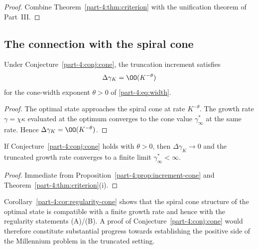 \begin{proof}
Combine Theorem~\ref{part-4:thm:criterion} with the unification theorem of 
Part~III.
\end{proof}

\subsection{The connection with the spiral cone}
\label{part-4:ssec:increment-cone}

\begin{proposition}\label{part-4:prop:increment-cone}
Under Conjecture~\ref{part-4:conj:cone}, the truncation increment satisfies
\begin{equation}\label{part-4:eq:increment-cone}
\Delta\gamma_K = \OO(K^{-\theta})
\end{equation}
for the cone-width exponent $\theta>0$ of \eqref{part-4:eq:width}.
\end{proposition}

\begin{proof}
The optimal state approaches the spiral cone at rate $K^{-\theta}$. 
The growth rate $\gamma = \chi\kappa$ evaluated at the optimum 
converges to the cone value $\gamma^\ast_\infty$ at the same rate. 
Hence $\Delta\gamma_K = \OO(K^{-\theta})$.
\end{proof}

\begin{corollary}\label{part-4:cor:regularity-cone}
If Conjecture~\ref{part-4:conj:cone} holds with $\theta>0$, then 
$\Delta\gamma_K\to 0$ and the truncated growth rate converges to a 
finite limit $\gamma^\ast_\infty<\infty$.
\end{corollary}

\begin{proof}
Immediate from Proposition~\ref{part-4:prop:increment-cone} and 
Theorem~\ref{part-4:thm:criterion}(i).
\end{proof}

\begin{remark}[Interpretation]\label{part-4:rem:regularity-interp}
Corollary~\ref{part-4:cor:regularity-cone} shows that the spiral cone 
structure of the optimal state is compatible with a finite growth 
rate and hence with the regularity statements (A)/(B). A proof of 
Conjecture~\ref{part-4:conj:cone} would therefore constitute substantial 
progress towards establishing the positive side of the Millennium 
problem in the truncated setting.
\end{remark}

